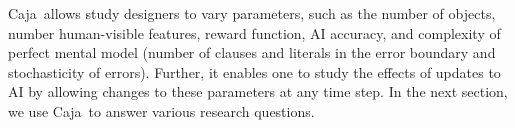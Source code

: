 \documentclass[letterpaper]{article} %
\newcommand{\eg}{\mbox{\it e.g.}}
\newcommand{\?}{\mbox{?}}
\newcommand{\plat}{{\sc Caja}}
\begin{document}
\plat\ allows study designers to vary parameters, such as the number of objects, number human-visible features, reward function, AI accuracy, and complexity of perfect mental model (number of clauses and literals in the   error boundary and stochasticity of errors). Further, it enables one to study the effects of updates to AI by allowing changes to these parameters at any time step. In the next section, we use \plat\ to answer various research questions.


\end{document}
